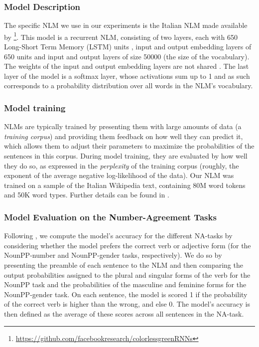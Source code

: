 \subsubsection{Model Description}
The specific NLM we use in our experiments is the Italian NLM made available by \citet{Gulordava:etal:2018}\footnote{\url{https://github.com/facebookresearch/colorlessgreenRNNs}}.
This model is a recurrent NLM, consisting of two layers, each with 650 Long-Short Term Memory (LSTM) units \citep{Hochreiter:Schmidhuber:1997}, input and output embedding layers of 650 units and input and output layers of size 50000 (the size of the vocabulary). 
The weights of the input and output embedding layers are not shared \citep{press2016using}.
The last layer of the model is a softmax layer, whose activations sum up to 1 and as such corresponds to a probability distribution over all words in the NLM's vocabulary. 

\subsubsection{Model training}
NLMs are typically trained by presenting them with large amounts of data (a \emph{training corpus}) and providing them feedback on how well they can predict it, which allows them to adjust their parameters to maximize the probabilities of the sentences in this corpus.
During model training, they are evaluated by how well they do so, as expressed in the \emph{perplexity} of the training corpus (roughly, the exponent of the average negative log-likelihood of the data).
Our NLM was trained on a sample of the Italian Wikipedia text, containing 80M word tokens and 50K word types. Further details can be found in \citet{Gulordava:etal:2018}.


\subsubsection{Model Evaluation on the Number-Agreement Tasks}
Following \citet{Linzen:etal:2016}, we compute the model's accuracy for the different NA-tasks by considering whether the model prefers the correct verb or adjective form (for the NounPP-number and NounPP-gender tasks, respectively).
We do so by presenting the preamble of each sentence to the NLM and then comparing the output probabilities assigned to the plural and singular forms of the verb for the NounPP task and the probabilities of the masculine and feminine forms for the NounPP-gender task.
On each sentence, the model is scored 1 if the probability of the correct verb is higher than the wrong, and else 0. 
The model's accuracy is then defined as the average of these scores across all sentences in the NA-task. 

